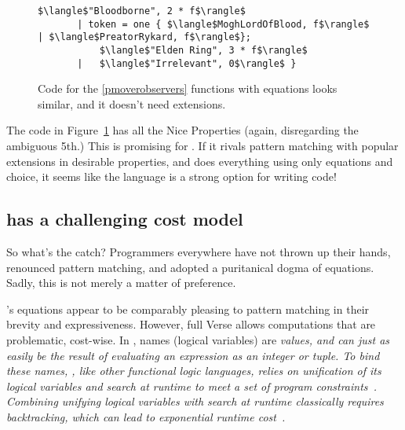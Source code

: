 \documentclass[manuscript,screen,review, 12pt, nonacm]{acmart}
\begin{document}
\begin{figure}[ht]
\begin{minipage}[h]{\linewidth}
\begin{lstlisting}[numbers=none, basicstyle=\tiny, xleftmargin=9em, 
                            frame=single, showstringspaces=false]
           $\langle$"Bloodborne", 2 * f$\rangle$
       | token = one { $\langle$MoghLordOfBlood, f$\rangle$ | $\langle$PreatorRykard, f$\rangle$}; 
           $\langle$"Elden Ring", 3 * f$\rangle$
       |   $\langle$"Irrelevant", 0$\rangle$ }
          \end{lstlisting}
            \label{fig:versegot} 
        \vspace{4ex}
        \end{minipage}%
    \caption{Code for the \ref{pmoverobservers} functions with equations looks
    similar, and it doesn't need extensions.}
    \label{fig:verseextfuncs}
      \end{figure}
        
    The code in Figure~\ref{fig:verseextfuncs} has all the Nice Properties
    (again, disregarding the ambiguous 5th.) This is promising for \VC. If it
    rivals pattern matching with popular extensions in desirable properties, and
    \VC does everything using only equations and choice, it seems like the
    language is a strong option for writing code! 

    \subsection{\VC has a challenging cost model}
    \label{vcbadcost}

    So what's the catch? Programmers everywhere have not thrown up their hands,
    renounced pattern matching, and adopted a puritanical dogma of equations. 
    Sadly, this is not merely a matter of preference. 

    \VC's equations appear to be comparably pleasing to pattern matching in
    their brevity and expressiveness. However, full Verse allows computations
    that are problematic, cost-wise. In \VC, names (logical variables) are
    \it{values}, and can just as easily be the result of evaluating an
    expression as an integer or tuple. To bind these names, \VC, like other
    functional logic languages, relies on \it{unification} of its logical
    variables and \it{search} at runtime to meet a set of program
    constraints~\citep{antoy2010functional, hanus2013functional}. Combining
    unifying logical variables with search at runtime classically requires
    backtracking, which can lead to exponential runtime
    cost~\citep{hanus2013functional, wadler1985replace, clark1982introduction}. 
\end{document}
